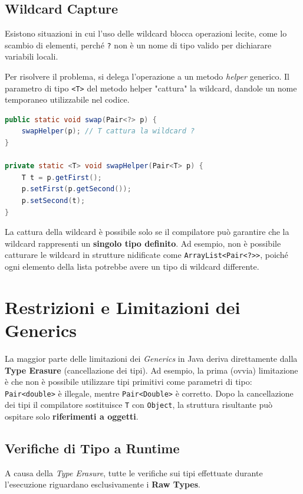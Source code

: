 \subsection{Wildcard Capture}

Esistono situazioni in cui l'uso delle wildcard blocca operazioni lecite, come lo scambio di elementi, perché \texttt{?} non è un nome di tipo valido per dichiarare variabili locali.

Per risolvere il problema, si delega l'operazione a un metodo \textit{helper} generico. Il parametro di tipo \texttt{<T>} del metodo helper "cattura" la wildcard, dandole un nome temporaneo utilizzabile nel codice.

\begin{lstlisting}[language=Java]
public static void swap(Pair<?> p) {
    swapHelper(p); // T cattura la wildcard ?
}

private static <T> void swapHelper(Pair<T> p) {
    T t = p.getFirst();
    p.setFirst(p.getSecond());
    p.setSecond(t);
}
\end{lstlisting}

La cattura della wildcard è possibile solo se il compilatore può garantire che la wildcard rappresenti un \textbf{singolo tipo definito}. 
Ad esempio, non è possibile catturare le wildcard in strutture nidificate come \texttt{ArrayList<Pair<?>>}, poiché ogni elemento della lista potrebbe avere un tipo di wildcard differente.

\section{Restrizioni e Limitazioni dei Generics}

La maggior parte delle limitazioni dei \textit{Generics} in Java deriva direttamente dalla \textbf{Type Erasure} (cancellazione dei tipi). Ad esempio, la prima (ovvia) limitazione è che non è possibile utilizzare tipi primitivi come parametri di tipo: \texttt{Pair<double>} è illegale, mentre \texttt{Pair<Double>} è corretto. Dopo la cancellazione dei tipi il compilatore sostituisce \texttt{T} con \texttt{Object}, la struttura risultante può ospitare solo \textbf{riferimenti a oggetti}. 

\subsection{Verifiche di Tipo a Runtime}
A causa della \textit{Type Erasure}, tutte le verifiche sui tipi effettuate durante l'esecuzione riguardano esclusivamente i \textbf{Raw Types}.

